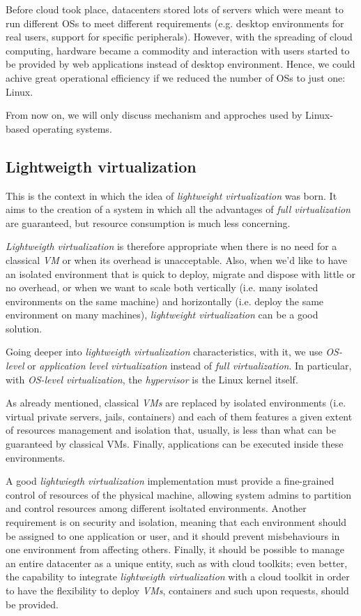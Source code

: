 \bigskip\noindent
Before cloud took place, datacenters stored lots of servers which were meant to
run different OSs to meet different requirements (e.g. desktop environments for
real users, support for specific peripherals). However, with the spreading of
cloud computing, hardware became a commodity and interaction with users started
to be provided by web applications instead of desktop environment. Hence, we
could achive great operational efficiency if we reduced the number of OSs to
just one: Linux.

\begin{note}
    From now on, we will only discuss mechanism and approches used by Linux-based
    operating systems.
\end{note}

\subsection{Lightweigth virtualization}
This is the context in which the idea of \emph{lightweight virtualization} was
born. It aims to the creation of a system in which all the advantages of \emph{full
virtualization} are guaranteed, but resource consumption is much less concerning.

\emph{Lightweigth virtualization} is therefore appropriate when there is no need
for a classical \emph{VM} or when its overhead is unacceptable. Also, when we'd like to
have an isolated environment that is quick to deploy, migrate and dispose with
little or no overhead, or when we want to scale both vertically (i.e. many
isolated environments on the same machine) and horizontally (i.e. deploy the
same environment on many machines), \emph{lightweight virtualization} can be a
good solution.

\bigskip\noindent
Going deeper into \emph{lightweigth virtualization} characteristics, with it,
we use \emph{OS-level} or \emph{application level virtualization} instead of
\emph{full virtualization}. In particular, with \emph{OS-level virtualization},
the \emph{hypervisor} is the Linux kernel itself.

As already mentioned, classical \emph{VMs} are replaced by isolated environments
(i.e. virtual private servers, jails, containers) and each of them features a
given extent of resources management and isolation that, usually, is less than
what can be guaranteed by classical VMs. Finally, applications can be executed
inside these environments.

A good \emph{lightwiegth virtualization} implementation must provide a
fine-grained control of resources of the physical machine, allowing system
admins to partition and control resources among different isoltated environments.
Another requirement is on security and isolation, meaning that each environment
should be assigned to one application or user, and it should prevent misbehaviours in
one environment from affecting others. Finally, it should be possible to manage
an entire datacenter as a unique entity, such as with cloud toolkits; even better,
the capability to integrate \emph{lightweigth virtualization} with a cloud
toolkit in order to have the flexibility to deploy \emph{VMs}, containers and such
upon requests, should be provided.

